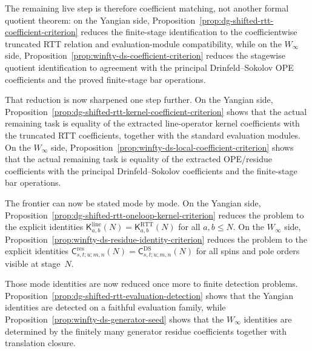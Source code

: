 \begin{remark}
The remaining live step is therefore coefficient matching, not another
formal quotient theorem: on the Yangian side,
Proposition~\ref{prop:dg-shifted-rtt-coefficient-criterion} reduces the
finite-stage identification to the coefficientwise truncated RTT
relation and evaluation-module compatibility, while on the
$W_\infty$ side,
Proposition~\ref{prop:winfty-ds-coefficient-criterion} reduces the
stagewise quotient identification to agreement with the principal
Drinfeld--Sokolov OPE coefficients and the proved finite-stage bar
operations.

That reduction is now sharpened one step further.  On the Yangian side,
Proposition~\ref{prop:dg-shifted-rtt-kernel-coefficient-criterion}
shows that the actual remaining task is equality of the extracted
line-operator kernel coefficients with the truncated RTT coefficients,
together with the standard evaluation modules.  On the
$W_\infty$ side,
Proposition~\ref{prop:winfty-ds-local-coefficient-criterion} shows that
the actual remaining task is equality of the extracted OPE/residue
coefficients with the principal Drinfeld--Sokolov coefficients and the
finite-stage bar operations.

The frontier can now be stated mode by mode.  On the Yangian side,
Proposition~\ref{prop:dg-shifted-rtt-oneloop-kernel-criterion} reduces
the problem to the explicit identities
$\mathsf{K}^{\mathrm{line}}_{a,b}(N)=\mathsf{K}^{\mathrm{RTT}}_{a,b}(N)$
for all $a,b\le N$.  On the $W_\infty$ side,
Proposition~\ref{prop:winfty-ds-residue-identity-criterion} reduces
the problem to the explicit identities
$\mathsf{C}^{\mathrm{res}}_{s,t;u;m,n}(N)
=\mathsf{C}^{\mathrm{DS}}_{s,t;u;m,n}(N)$
for all spins and pole orders visible at stage~$N$.

Those mode identities are now reduced once more to finite detection
problems.  Proposition~\ref{prop:dg-shifted-rtt-evaluation-detection}
shows that the Yangian identities are detected on a faithful
evaluation family, while
Proposition~\ref{prop:winfty-ds-generator-seed} shows that the
$W_\infty$ identities are determined by the finitely many generator
residue coefficients together with translation closure.


\end{remark}

